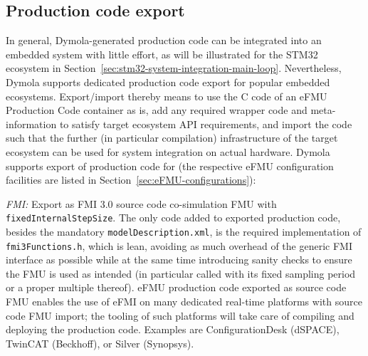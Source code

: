 \subsection{Production code export}\label{sec:production-code-export}

In general, Dymola-generated production code can be integrated into an embedded system with little effort, as will be illustrated for the STM32 ecosystem in Section~\ref{sec:stm32-system-integration-main-loop}. Nevertheless, Dymola supports dedicated production code export for popular embedded ecosystems. Export/import thereby means to use the C code of an eFMU Production Code container as is, add any required wrapper code and meta-information to satisfy target ecosystem API requirements, and import the code such that the further (in particular compilation) infrastructure of the target ecosystem can be used for system integration on actual hardware. Dymola supports export of production code for (the respective eFMU configuration facilities are listed in Section~\ref{sec:eFMU-configurations}):

\squishlist
    \item \textit{FMI\regtm{}:} Export as FMI 3.0 source code co-simulation FMU with \texttt{fixedInternalStepSize}. The only code added to exported production code, besides the mandatory \texttt{modelDescription.xml}, is the required implementation of \texttt{fmi3Functions.h}, which is lean, avoiding as much overhead of the generic FMI interface as possible while at the same time introducing sanity checks to ensure the FMU is used as intended (in particular called with its fixed sampling period or a proper multiple thereof). eFMU production code exported as source code FMU enables the use of eFMI on many dedicated real-time platforms with source code FMU import; the tooling of such platforms will take care of compiling and deploying the production code. Examples are ConfigurationDesk\regtm{} (dSPACE), TwinCAT\regtm{} (Beckhoff\regtm{}), or Silver\regtm{} (Synopsys\regtm{}).
    
